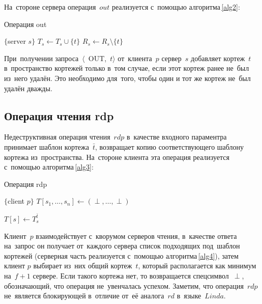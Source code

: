 На~стороне сервера операция~$out$ реализуется с~помощью алгоритма\,\ref{alg2}:
	
\begin{algorithm}[H]
	\caption{Операция out}\label{alg2}
	\begin{algorithmic}[1]
		\Statex $\{$server $s \}$
				\State $T_s \gets T_s \cup \{t\}$
			\EndIf
			\State $R_s \gets R_s \setminus \{t\}$
		\EndUpon
	\end{algorithmic}
\end{algorithm}

При~получении запроса~$\langle$~OUT,~$t \rangle$ от~клиента~$p$ сервер~$s$ добавляет кортеж~$t$ в~пространство кортежей только в~том случае, если этот кортеж ранее не~был из~него удалён. Это необходимо для~того, чтобы один и тот же кортеж не~был удалён дважды.

\subsection{Операция чтения rdp}\label{subsec5:2}
Недеструктивная операция чтения~$rdp$ в~качестве входного параментра принимает шаблон кортежа~$\bar t$, возвращает копию соответствующего шаблону кортежа из~пространства. На~стороне клиента эта операция реализуется с~помощью алгоритма\,\ref{alg3}:

\begin{algorithm}[H]
	\caption{Операция rdp}\label{alg3}
	\begin{algorithmic}[1]
		\Statex $\{$client $p \}$
		\State $T[s_1, \dots, s_n] \gets (\perp, \dots, \perp)$
		
		\State {}
		\EndFor
		
		\Repeat
		\State {}
		\State $T[s] \gets T_s^{\bar t}$
		
		\State {}
		\EndIf
		\State \Return{$\perp$}
		\EndFunction
	\end{algorithmic}
\end{algorithm}

Клиент~$p$ взаимодействует с~кворумом серверов чтения, в~качестве ответа на~запрос он получает от~каждого сервера список подходящих под~шаблон кортежей (серверная часть реализуется с~помощью алгоритма\,\ref{alg4}), затем клиент $p$ выбирает из~них общий кортеж~$t$, который располагается как минимум на~$f + 1$ сервере. Если такого кортежа нет, то возвращается спецсимвол~$\perp$, обозначающий, что операция не~увенчалась успехом. Заметим, что операция~$rdp$ не~является блокирующей в~отличие от~её аналога~$rd$ в~языке~$Linda$.

